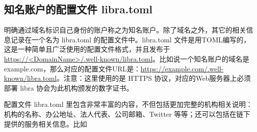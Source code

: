 \subsection{知名账户的配置文件 libra.toml}
明确通过域名标识自己身份的账户称之为知名账户。除了域名之外，其它的相关信息记录在一个名为 libra.toml 的配置文件中。libra.toml 文件是用TOML编写的，这是一种简单且广泛使用的配置文件格式，并且发布于 \url{https://<DomainName>/.well-known/libra.toml}。比如说一个知名账户的域名是 example.com，那么对应的配置文件URL是：\url{https://example.com/.well-known/libra.toml}。注意：这里使用的是 HTTPS 协议，对应的Web服务器上必须部署 libra 协会为此机构颁发的数字证书。

配置文件 libra.toml 里包含非常丰富的内容，不但包括更加完整的机构相关说明：机构的名称、办公地址、法人代表、公司邮箱、Twitter 等等；还可以包括在链下提供的服务相关信息。比如

